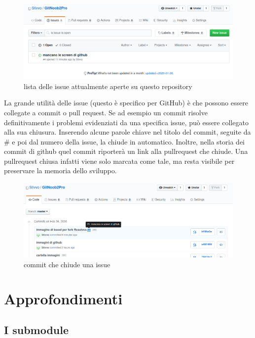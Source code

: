 \documentclass{article}
\begin{document}
\begin{figure}
\includegraphics[width=6in]{img/issue.png}
\centering
\caption{lista delle issue attualmente aperte su questo repository }
\end{figure}

La grande utilità delle issue (questo è specifico per GitHub) è che possono
essere collegate a commit o pull request. Se ad esempio un commit risolve
definitivamente i problemi evidenziati da una specifica issue, può essere
collegato alla sua chiusura.
Inserendo alcune 
{parole chiave}
nel titolo del commit, seguite da \# e poi dal numero della issue, la chiude in
automatico. Inoltre, nella storia dei commit di github quel commit riporterà un
link alla pullrequest che chiude. Una pullrequest chiusa infatti viene solo
marcata come tale, ma resta visibile per preservare la memoria dello sviluppo.

\begin{figure}
\includegraphics[width=6in]{img/commitCloseIssue.png}
\centering
\caption{commit che chiude una issue }
\end{figure}

\section{Approfondimenti}

\subsection{I submodule}
\end{document}
